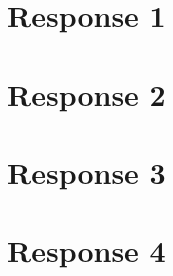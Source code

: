 \documentclass[12pt, a4paper]{article}
\begin{document}
\maketitle
\section*{\centering Response 1}

\newpage
\section*{\centering Response 2}
\newpage
\section*{\centering Response 3}
\newpage
\section*{\centering Response 4}
\end{document}
